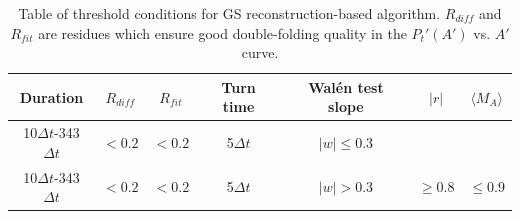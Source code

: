 \begin{table}[h!]
\centering
\caption[Threshold conditions for GS algorithm]{Table of threshold conditions for GS reconstruction-based algorithm. $R_{diff}$ and $R_{fit}$ are residues which ensure good double-folding quality in the $P_t'(A')$ vs. $A'$ curve.} %
\begin{tabular}{ccccccc}
\toprule
    Duration  & $R_{diff}$ & $R_{fit}$ & Turn time & Wal\'en test slope & $|r|$ & $\langle M_A\rangle$ \\ 
    \hline
    10$\Delta t$-343$\Delta t$ & $<0.2$ & $<0.2$ & 5$\Delta t$ & $|w|\leq 0.3$ & & \\
    10$\Delta t$-343$\Delta t$ & $<0.2$ & $<0.2$ & 5$\Delta t$ & $|w|> 0.3$ & $\geq 0.8$ & $\leq 0.9$ \\
\bottomrule %
\end{tabular}
\label{tab:thresholds}
\end{table}


